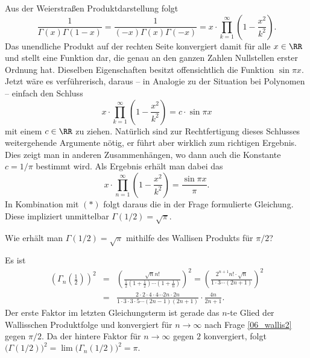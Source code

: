   \begin{antwort}
    Aus der Weierstraß\sch en Produktdarstellung folgt
    \[
    \frac{1}{\Gamma(x)\Gamma(1-x)} = 
    \frac{1}{(-x)\Gamma(x)\Gamma(-x)} = 
    x \cdot \prod_{k=1}^\infty \left( 1-\frac{x^2}{k^2} \right).
    \]
    Das unendliche Produkt auf der rechten Seite 
    konvergiert damit für alle $x\in \RR$ und stellt eine 
    Funktion dar, die genau an den ganzen Zahlen Nullstellen 
    erster Ordnung hat. Dieselben Eigenschaften 
    besitzt offensichtlich die Funktion $\sin \pi x$. 
    Jetzt wäre es verführerisch, daraus -- in Analogie zu der 
    Situation bei Polynomen -- einfach den Schluss  
    \[
    x \cdot \prod_{k=1}^\infty \left( 1-\frac{x^2}{k^2} \right)
    = c \cdot \sin \pi x
    \]
    mit einem $c\in\RR$ zu ziehen. 
    Natürlich sind zur Rechtfertigung dieses Schlusses 
    weitergehende Argumente nötig, er führt aber 
     wirklich zum richtigen Ergebnis.   
    Dies zeigt man in anderen Zusammenhängen, 
    wo dann auch die Konstante $c=1/\pi$ bestimmt wird. 
    Als Ergebnis erhält man dabei das 
    \[
    \boxed{ 
      x\cdot \prod_{n=1}^\infty \left(1-\frac{x^2}{k^2} \right) = 
      \frac{\sin \pi x}{ \pi }.
    }
    \]
    In Kombination mit $(\ast)$ folgt daraus die in der Frage formulierte 
    Gleichung. Diese impliziert unmittelbar $\Gamma(1/2)=\sqrt{\pi}$.
    \AntEnd
  \end{antwort}



  \begin{frage}
    Wie erhält man $\Gamma (1/2)= \sqrt{\pi}$ mithilfe des 
    Wallis\sch en Produkts für $\pi/2$?
  \end{frage}

  \begin{antwort}
    Es ist 
    \begin{eqnarray*}
      \left( \Gamma_n\left( \frac{1}{2} \right) \right)^2  &=& 
      \left( 
        \frac{\sqrt{n} n! }{ 
          \frac{1}{2}
          \left( 1+\frac{1}{2} \right)
          \cdots 
          \left( 1+\frac{1}{n} \right)
        } \right)^2
      =
      \left( 
        \frac{ 2^{n+1} n! \cdot\sqrt{n} }{ 
          1\cdot 3 \cdots (2n+1) } \right)^2 \\
      &=& 
      \frac{ 2\cdot 2 \cdot 4 \cdot 4 \cdots 2n\cdot 2n}{
        1\cdot 3 \cdot 3 \cdot 5 \cdots (2n-1)(2n+1)}
      \cdot \frac{4n}{2n+1}. 
    \end{eqnarray*}
    Der erste Faktor im letzten Gleichungsterm 
    ist gerade das $n$-te Glied der 
    Wallisschen Produktfolge und konvergiert   
    für $n\to \infty$ nach Frage \ref{06_wallis2} gegen 
    $\pi/2$. Da der hintere Faktor für $n\to\infty$ gegen $2$ 
    konvergiert, folgt 
    $\big(\Gamma(1/2)\big)^2 = 
    \lim \big(\Gamma_n (1/2)\big)^2 = \pi.$
    \AntEnd 
  \end{antwort}


